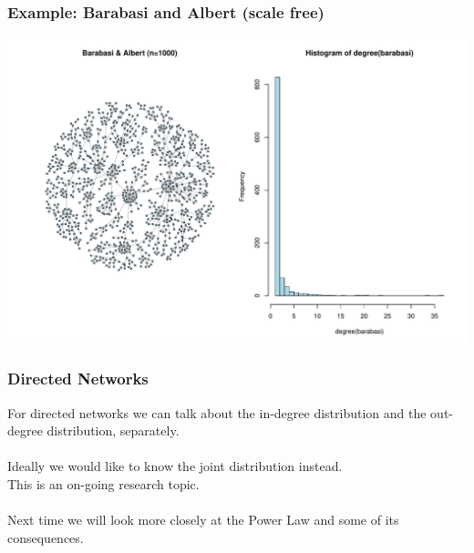 \documentclass[smaller]{beamer}
\begin{document}
\begin{frame}
\frametitle{Example: Barabasi and Albert (scale free)}
\includegraphics[scale=0.4]{figures/barabasi.pdf} 
\end{frame}

\begin{frame}
\frametitle{Directed Networks}
For directed networks we can talk about the in-degree distribution and the
out-degree distribution, separately.\\
${}_{}$\\
Ideally we would like to know the joint distribution instead. \\
This is an on-going research topic.\\ 
${}_{}$\\
Next time we will look more closely at the Power Law and some of its consequences.
\end{frame}
\end{document}
